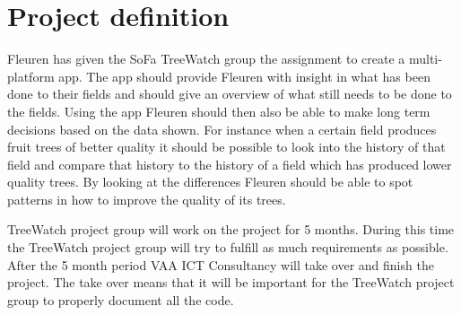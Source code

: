 
\section {Project definition}
Fleuren has given the SoFa TreeWatch group the assignment to create a multi-platform app. The app should provide Fleuren with insight in what has been done to their fields and should give an overview of what still needs to be done to the fields. Using the app Fleuren should then also be able to make long term decisions based on the data shown. For instance when a certain field produces fruit trees of better quality it should be possible to look into the history of that field and compare that history to the history of a field which has produced lower quality trees. By looking at the differences Fleuren should be able to spot patterns in how to improve the quality of its trees.

TreeWatch project group will work on the project for 5 months. During this time the TreeWatch project group will try to fulfill as much requirements as possible. After the 5 month period VAA ICT Consultancy will take over and finish the project. The take over means that it will be important for the TreeWatch project group to properly document all the code.



